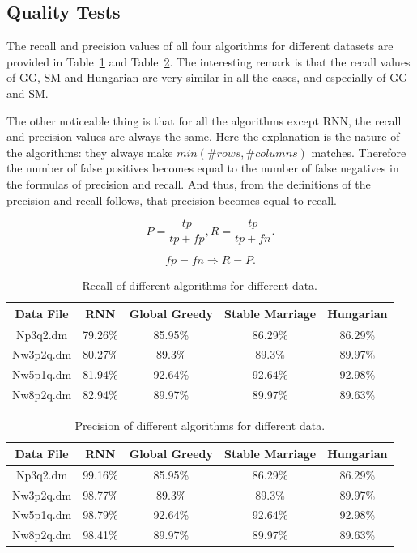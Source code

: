 \documentclass[a4paper,11pt]{article}
\begin{document}
\subsection{Quality Tests}

The recall and precision values of all four algorithms for different datasets are provided in Table~\ref{recall} and Table~\ref{precision}. The interesting remark is that the recall values of GG, SM and Hungarian are very similar in all the cases, and especially of GG and SM. %

The other noticeable thing is that for all the algorithms except RNN, the recall and precision values are always the same. Here the explanation is the nature of the algorithms: they always make $min(\#rows, \#columns)$ matches. Therefore the number of false positives becomes equal to the number of false negatives in the formulas of precision and recall. And thus, from the definitions of the precision and recall follows, that precision becomes equal to recall.


\[P = \frac{tp}{tp+fp}, R = \frac{tp}{tp+fn}.\]

\[fp=fn \Rightarrow R=P.\]

\begin{table}[tbh]
\centering
\begin{tabular}{|c|c|c|c|c|}
\hline 
Data File & RNN & Global Greedy & Stable Marriage & Hungarian \tabularnewline
\hline 
\hline 
 Np3q2.dm & 79.26\% & 85.95\% & 86.29\% & 86.29\%\tabularnewline
\hline
 Nw3p2q.dm & 80.27\% & 89.3\% & 89.3\% & 89.97\%\tabularnewline
\hline 
 Nw5p1q.dm & 81.94\% & 92.64\% & 92.64\% & 92.98\%\tabularnewline
\hline 
 Nw8p2q.dm & 82.94\% & 89.97\% & 89.97\% & 89.63\%\tabularnewline
\hline
\end{tabular}
\caption{Recall of different algorithms for different data.}
\label{recall}
\end{table}

\begin{table}[tbh]
\centering
\begin{tabular}{|c|c|c|c|c|}
\hline 
Data File & RNN & Global Greedy & Stable Marriage & Hungarian \tabularnewline
\hline 
\hline 
 Np3q2.dm & 99.16\% & 85.95\% & 86.29\% & 86.29\%\tabularnewline
\hline
 Nw3p2q.dm & 98.77\% & 89.3\% & 89.3\% & 89.97\%\tabularnewline
\hline 
 Nw5p1q.dm & 98.79\% & 92.64\% & 92.64\% & 92.98\%\tabularnewline
\hline 
 Nw8p2q.dm & 98.41\% & 89.97\% & 89.97\% & 89.63\%\tabularnewline
\hline
\end{tabular}
\caption{Precision of different algorithms for different data.}
\label{precision}
\end{table}
\end{document}
